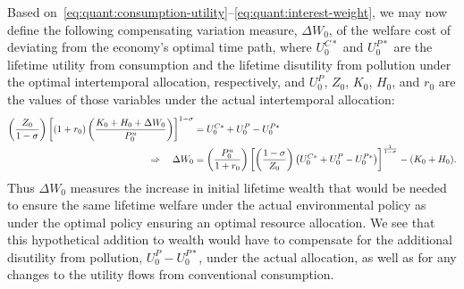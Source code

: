 Based on~\eqref{eq:quant:consumption-utility}--\eqref{eq:quant:interest-weight}, we may now define the following compensating variation measure, $\Delta W_0$, of the welfare cost of deviating from the economy's optimal time path, where $U_0^{C*}$ and $U_0^{P*}$ are the lifetime utility from consumption and the lifetime disutility from pollution under the optimal intertemporal allocation, respectively, and $U_0^P$, $Z_0$, $K_0$, $H_0$, and $r_0$ are the values of those variables under the actual intertemporal allocation:
\begin{align}
\left(\frac{Z_0}{1-\sigma}\right)\left[(1+r_0)\left(\frac{K_0+H_0+\Delta W_0}{P_0^u}\right)\right]^{1-\sigma} &= U_0^{C*} + U_0^P - U_0^{P*}
\notag \\
\Rightarrow \quad
\Delta W_0 &= \left(\frac{P_0^u}{1+r_0}\right)\left[\left(\frac{1-\sigma}{Z_0}\right)\left(U_0^{C*}+U_0^P-U_0^{P*}\right)\right]^{\frac{1}{1-\sigma}} - (K_0+H_0).
\label{eq:quant:compensating-variation}
\end{align}
Thus $\Delta W_0$ measures the increase in initial lifetime wealth that would be needed to ensure the same lifetime welfare under the actual environmental policy as under the optimal policy ensuring an optimal resource allocation. We see that this hypothetical addition to wealth would have to compensate for the additional disutility from pollution, $U_0^P - U_0^{P*}$, under the actual allocation, as well as for any changes to the utility flows from conventional consumption.

